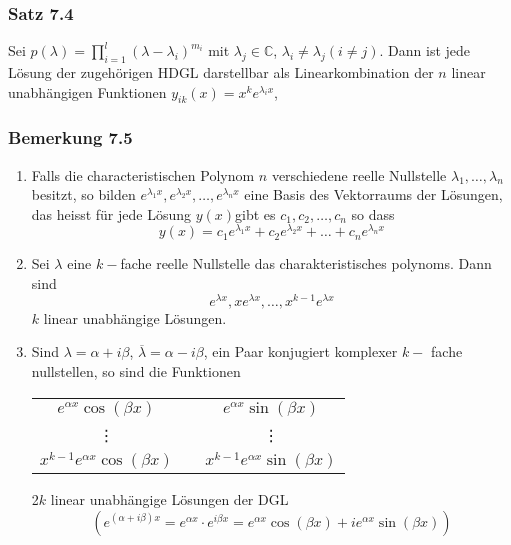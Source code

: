 \subsubsection*{Satz 7.4}
Sei $p(\lambda ) = \prod\limits_{i = 1}^l {{{(\lambda  - {\lambda _i})}^{{m_i}}}} $ mit $\lambda _j\in\mathbb{C}$, $\lambda_i\not=\lambda_j (i\not=j)$. Dann ist jede Lösung der zugehörigen HDGL darstellbar als Linearkombination der $n$ linear unabhängigen Funktionen $y_{ik}(x)=x^ke^{\lambda_ix}$, 

\subsubsection*{Bemerkung 7.5}
\begin{enumerate}
\item Falls die characteristischen Polynom $n$ verschiedene reelle Nullstelle $\lambda_1,\dots,\lambda_n$ besitzt, so bilden ${e^{{\lambda _1}x}},{e^{{\lambda _2}x}}, \ldots ,{e^{{\lambda _n}x}}$ eine Basis des Vektorraums der Lösungen, das heisst für jede Lösung $y(x)$gibt es $c_1,c_2,\dots,c_n$ so dass $$y(x)={c_1}{e^{{\lambda _1}x}} + {c_2}{e^{{\lambda _2}x}} +  \ldots  + {c_n}{e^{{\lambda _n}x}}$$

\item Sei $\lambda$ eine $k-$fache reelle Nullstelle das charakteristisches polynoms. Dann sind $$e^{\lambda x},xe^{\lambda x},\dots ,x^{k-1}e^{\lambda x}$$ $k$ linear unabhängige Lösungen. 
\item Sind $\lambda=\alpha+i\beta$, $\overline{\lambda}=\alpha-i\beta$,  ein Paar konjugiert komplexer $k-$ fache nullstellen, so sind die Funktionen\\\begin{center}
\begin{tabular}{c c c}
$e^{\alpha x}\cos\left(\beta x\right)$&\hspace{10mm}&$e^{\alpha x}\sin\left(\beta x\right)$\\
\vdots&\hspace{10mm} & \vdots\\
$x^{k-1}e^{\alpha x}\cos\left(\beta x\right)$&\hspace{10mm}&$x^{k-1}e^{\alpha x}\sin\left(\beta x\right)$\\
\end{tabular}
\end{center}
2$k$ linear unabhängige Lösungen der DGL \[\left( {{e^{\left( {\alpha  + i\beta } \right)x}} = {e^{\alpha x}} \cdot {e^{i\beta x}} = {e^{\alpha x}}\cos \left( {\beta x} \right) + i{e^{\alpha x}}\sin \left( {\beta x} \right)} \right)\]
\end{enumerate}


